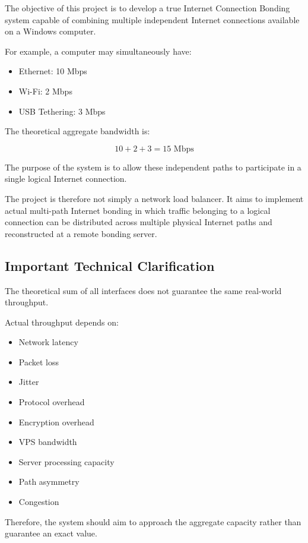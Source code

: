 \documentclass[12pt,a4paper]{article}
\begin{document}
The objective of this project is to develop a true Internet Connection Bonding system capable of combining multiple independent Internet connections available on a Windows computer.

For example, a computer may simultaneously have:

\begin{itemize}
    \item Ethernet: 10 Mbps
    \item Wi-Fi: 2 Mbps
    \item USB Tethering: 3 Mbps
\end{itemize}

The theoretical aggregate bandwidth is:

\[
10 + 2 + 3 = 15\text{ Mbps}
\]

The purpose of the system is to allow these independent paths to participate in a single logical Internet connection.

The project is therefore not simply a network load balancer. It aims to implement actual multi-path Internet bonding in which traffic belonging to a logical connection can be distributed across multiple physical Internet paths and reconstructed at a remote bonding server.

\subsection{Important Technical Clarification}

The theoretical sum of all interfaces does not guarantee the same real-world throughput.

Actual throughput depends on:

\begin{itemize}
    \item Network latency
    \item Packet loss
    \item Jitter
    \item Protocol overhead
    \item Encryption overhead
    \item VPS bandwidth
    \item Server processing capacity
    \item Path asymmetry
    \item Congestion
\end{itemize}

Therefore, the system should aim to approach the aggregate capacity rather than guarantee an exact value.
\end{document}
